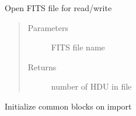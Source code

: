 \documentclass[letterpaper,10pt,english]{sphinxmanual}
\begin{document}

\begin{fulllineitems}
\label{\detokenize{qfits_functions:qfits.fitsupdate}}
Open FITS file for read/write
\begin{quote}\begin{description}
\item[{Parameters}] \leavevmode
{} \textendash{} FITS file name

\item[{Returns}] \leavevmode
number of HDU in file

\end{description}\end{quote}

\end{fulllineitems}


\begin{fulllineitems}
\label{\detokenize{qfits_functions:qfits.init}}
Initialize common blocks on import

\end{fulllineitems}

\end{document}
